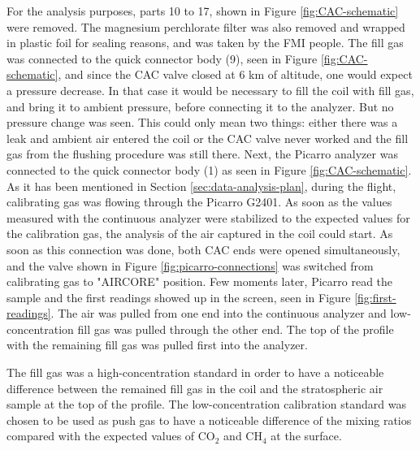 For the analysis purposes, parts 10 to 17, shown in Figure \ref{fig:CAC-schematic} were removed. The magnesium perchlorate filter was also removed and wrapped in plastic foil for sealing reasons, and was taken by the FMI people. The fill gas was connected to the quick connector body (9), seen in Figure \ref{fig:CAC-schematic}, and since the CAC valve closed at 6 km of altitude, one would expect a pressure decrease. In that case it would be necessary to fill the coil with fill gas, and bring it to ambient pressure, before connecting it to the analyzer. But no pressure change was seen. This could only mean two things: either there was a leak and ambient air entered the coil or the CAC valve never worked and the fill gas from the flushing procedure was still there. Next, the Picarro analyzer was connected to the quick connector body (1) as seen in Figure \ref{fig:CAC-schematic}. As it has been mentioned in Section \ref{sec:data-analysis-plan}, during the flight, calibrating gas was flowing through the Picarro G2401. As soon as the values measured with the continuous analyzer were stabilized to the expected values for the calibration gas, the analysis of the air captured in the coil could start. As soon as this connection was done, both CAC ends were opened simultaneously, and the valve shown in Figure \ref{fig:picarro-connections} was switched from calibrating gas to "AIRCORE" position. Few moments later, Picarro read the sample and the first readings showed up in the screen, seen in Figure \ref{fig:first-readings}. The air was pulled from one end into the continuous analyzer and low-concentration fill gas was pulled through the other end. The top of the profile with the remaining fill gas was pulled first into the analyzer.

The fill gas was a high-concentration standard in order to have a noticeable difference between the remained fill gas in the coil and the stratospheric air sample at the top of the profile. The low-concentration calibration standard was chosen to be used as push gas to have a noticeable difference of the mixing ratios compared with the expected values of CO$_2$ and CH$_4$ at the surface.

